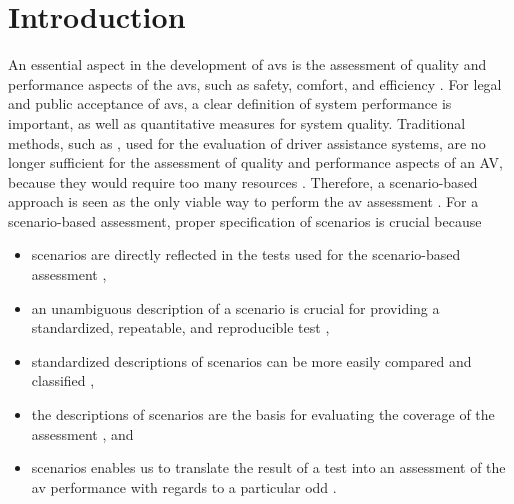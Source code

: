 \section{Introduction}
\label{sec:introduction}

An essential aspect in the development of \acp{av} is the assessment of quality and performance aspects of the \acp{av}, such as safety, comfort, and efficiency \autocite{bengler2014threedecades, wachenfeld2016release, Helmer2017safety, stellet2015taxonomy, gietelink2006development, putz2017pegasus, roesener2017comprehensive, riedmaier2020survey}.
For legal and public acceptance of \acp{av}, a clear definition of system performance is important, as well as quantitative measures for system quality. 
Traditional methods, such as \autocite{response2006code, ISO26262}, used for the evaluation of driver assistance systems, are no longer sufficient for the assessment of quality and performance aspects of an AV, because they would require too many resources \autocite{wachenfeld2016release}. 
\cstartc Therefore, a scenario-based approach is seen as the only viable way to perform the \ac{av} assessment \autocite{putz2017pegasus, elrofai2018scenario, riedmaier2020survey}. 
For a scenario-based assessment, proper specification of scenarios is crucial because 
\begin{itemize}
	\item scenarios are directly reflected in the tests used for the scenario-based assessment \autocite{stellet2015taxonomy, aparicio2013pre, ulbrich2015, geyer2014, putz2017pegasus, zofka2015datadrivetrafficscenarios},
	\item an unambiguous description of a scenario is crucial for providing a standardized, repeatable, and reproducible test \autocite{aparicio2013pre},
	\item standardized descriptions of scenarios can be more easily compared and classified \autocite{degelder2019scenariocategories},
	\item the descriptions of scenarios are the basis for evaluating the coverage of the assessment \autocite{putz2017pegasus}, and
	\item scenarios enables us to translate the result of a test into an assessment of the \ac{av} performance with regards to a particular \ac{odd} \autocite{weber2019framework, gyllenhammar2020towards}.
\end{itemize}

